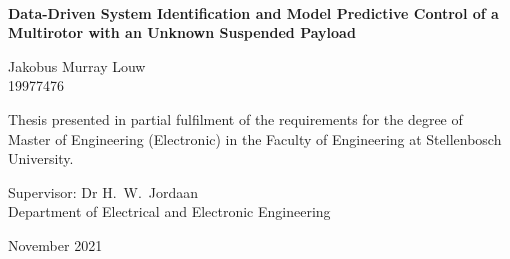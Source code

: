 \graphicspath{{frontmatter/fig/}}

\begin{titlepage}
	\begin{center}
		
		
		
		~\vspace{-2em}
		
		{\sffamily \bfseries \huge Data-Driven System Identification and Model Predictive Control of a Multirotor with an Unknown Suspended Payload \par}
		
		\vspace{4em}
		
		{\large {\Large  Jakobus Murray Louw} \\ 19977476 \par}
		
		\vspace{8em}
		
		{\large Thesis presented in partial fulfilment of the requirements for the degree of \\ Master of Engineering (Electronic) in the Faculty of Engineering at Stellenbosch University. \par}
		
		\vfill
		
		{\large {Supervisor}: Dr H.\ W.\ Jordaan\\
		Department of Electrical and Electronic Engineering \par}
		
		\vspace{10em}
		
		{\Large November 2021}
	\end{center}
\end{titlepage}
